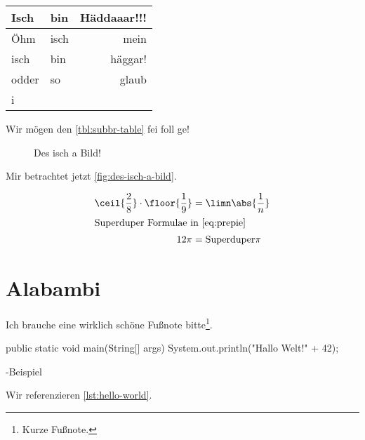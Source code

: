 \documentclass[userip]{lecture-digital}
\begin{document}
\begin{table}
    \centering%
    \label{tbl:subbr-table}
    \begin{tabular}{llr}
        \toprule
            Isch & bin & Häddaaar!!! \\
        \midrule
            Öhm & isch & mein \\
            isch & bin & häggar!\\
            odder & so & glaub \\
            i \\
        \bottomrule
    \end{tabular}
\end{table}
Wir mögen den \autoref{tbl:subbr-table} fei foll ge!
\Blindtext[1]
\begin{figure*}
    \centering{}
    \caption[Des isch a breites Bild!]{Des isch a Bild!}
    \label{fig:des-isch-a-bild}
\end{figure*}
Mir betrachtet jetzt \autoref{fig:des-isch-a-bild}.
\Blindtext[1]
\begin{wide}
    \begin{align}
        \ceil{\frac{2}{8}} \cdot \floor{\frac{1}{9}}& = \limn\abs{\frac{1}{n}} \label{eq:prepie}\\
        \intertext{Superduper Formulae in \autoref{eq:prepie}}
        12 \pi &= \text{Superduper}\pi
    \end{align}
\end{wide}
\Blindtext[8]
\section{Alabambi}
Ich brauche eine wirklich schöne Fußnote bitte\footnote{Kurze Fußnote.}.
\begin{code*}
\centering\begin{minipage}{0.8\linewidth}
\begin{java}
public static void main(String[] args) {
    System.out.println("Hallo Welt!" + 42);
}
\end{java}
\end{minipage}
\caption{-Beispiel}
\label{lst:hello-world}
\end{code*}
Wir referenzieren \autoref{lst:hello-world}.
\Blindtext[6]
\end{document}
